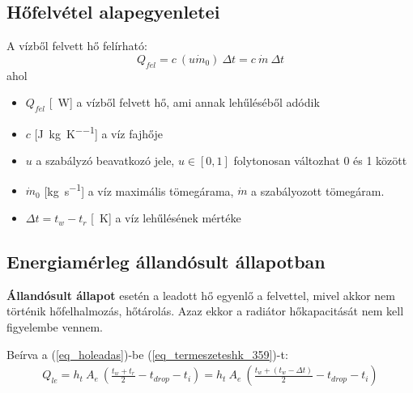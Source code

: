 %
%
%
%
\subsection{Hőfelvétel alapegyenletei}
A vízből felvett hő felírható:
\begin{equation} \label{eq_hofelvetel}
 Q_{fel} = c ~ (u\dot{m}_0) ~ \Delta t=c ~ \dot{m} ~ \Delta t
\end{equation}
ahol
\begin{itemize}[itemsep=6pt,topsep=0pt,parsep=0pt,partopsep=0pt]
	\item[] ${Q}_{fel}$ [\SI{}{\watt}] a vízből felvett hő, ami annak lehűléséből adódik
	\item[] $c$ [\si[per-mode = fraction]{\joule\per\kg\per\kelvin}] a víz fajhője
	\item[] $u$ a szabályzó beavatkozó jele, $ u \in [0,1]$ folytonosan változhat 0 és 1 között
	\item[] $\dot{m}_0$ [\si[per-mode = fraction]{\kg\per\second}] a víz maximális tömegárama, $\dot{m}$ a szabályozott tömegáram.
	\item[] $\Delta t = t_w-t_r$ [\SI{}{\kelvin}] a víz lehűlésének mértéke
\end{itemize}

\subsection{Energiamérleg állandósult állapotban}
\textbf{Állandósult állapot} esetén a leadott hő egyenlő a felvettel, mivel akkor nem történik hőfelhalmozás, hőtárolás.
Azaz ekkor a radiátor hőkapacitását nem kell figyelembe vennem.

Beírva a (\ref{eq_holeadas})-be (\ref{eq_termeszeteshk_359})-t:
\begin{equation} \label{eq_holeadas2}
\begin{aligned}
 Q_{le} = h_t ~ A_e ~ \left( \frac{t_w+t_r}{2}-t_{drop} - t_i\right) = h_t ~ A_e ~ \left( \frac{t_w+(t_w-\Delta t)}{2}-t_{drop}-t_i\right)
\end{aligned}
\end{equation}

